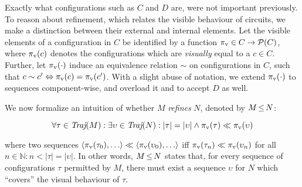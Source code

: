 Exactly what configurations such as $C$ and $D$ are, were not important previously. To reason about refinement, which relates the visible behaviour of circuits, we make a distinction between their external and internal elements. Let the visible elements of a configuration in $C$ be identified by a function $\pi_{\textrm{v}} \in C \rightarrow \mathcal{P}(C)$, where $\pi_{\textrm{v}}(c)$ denotes the configurations which are \textit{visually} equal to a $c \in C$. Further, let $\pi_{\textrm{v}}(\cdot)$ induce an equivalence relation $\sim$ on configurations in $C$, such that $c \sim c' \Leftrightarrow \pi_{\textrm{v}}(c) = \pi_{\textrm{v}}(c')$. With a slight abuse of notation, we extend $\pi_{\textrm{v}}(\cdot)$ to sequences component-wise, and overload it and to accept $D$ as well.



We now formalize an intuition of whether $M$ \textit{refines} $N$, denoted by $M \operatorname{\leq} N$:

\begin{equation*}
\forall \tau \in \operatorname{\textit{Traj}}(M) : \exists \upsilon \in \operatorname{\textit{Traj}}(N) : | \tau | = | \upsilon | \wedge \pi_{\textrm{v}}(\tau) \ll \pi_{\textrm{v}}(\upsilon)
\end{equation*}

\noindent where two sequences $\langle \pi_{\textrm{v}}(\tau_{0}), \ldots \rangle \ll \langle \pi_{\textrm{v}}(\upsilon_{0}), \ldots \rangle$ iff $\pi_{\textrm{v}}(\tau_{n}) \ll \pi_{\textrm{v}}(\upsilon_{n})$ for all $n \in \mathbb{N} : n < | \tau | = | \upsilon |$. In other words, $M \operatorname{\leq} N$ states that, for every sequence of configurations $\tau$ permitted by $M$, there must exist a sequence $\upsilon$ for $N$ which ``covers'' the visual behaviour of $\tau$.



